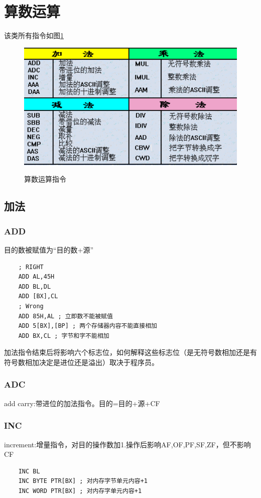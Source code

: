 \section{算数运算}
该类所有指令如图\ref{算数运算指令}
\begin{figure}[H]
    \centering 
    \includegraphics[scale=1]{part_指令系统/part_指令系统_pic/算数运算指令.png}
    \label{算数运算指令}
    \caption{算数运算指令}
\end{figure}
\subsection{加法}
\subsubsection{ADD}
目的数被赋值为“目的数+源”
\begin{lstlisting}
    ; RIGHT
    ADD AL,45H
    ADD BL,DL 
    ADD [BX],CL
    ; Wrong
    ADD 85H,AL ; 立即数不能被赋值
    ADD 5[BX],[BP] ; 两个存储器内容不能直接相加
    ADD BX,CL ; 字节和字不能相加
\end{lstlisting}
加法指令结束后将影响六个标志位，如何解释这些标志位（是无符号数相加还是有符号数相加决定是进位还是溢出）取决于程序员。
\subsubsection{ADC}
add carry:带进位的加法指令。目的=目的+源+CF
\subsubsection{INC}
increment:增量指令，对目的操作数加1.操作后影响AF,OF,PF,SF,ZF，但不影响CF
\begin{lstlisting}
    INC BL 
    INC BYTE PTR[BX] ; 对内存字节单元内容+1
    INC WORD PTR[BX] ; 对内存字单元内容+1
\end{lstlisting}

